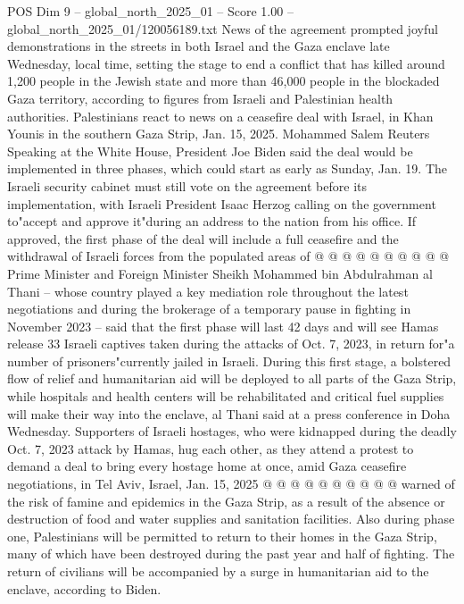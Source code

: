 \begin{textsample}{POS Dim 9 – global\_north\_2025\_01 – Score 1.00 – global\_north\_2025\_01/120056189.txt}  \label{ex:f9_pos_355}
News of the agreement prompted joyful demonstrations in the streets in both Israel and the Gaza enclave late Wednesday, local time, setting the stage to end a conflict that has killed around 1,200 people in the Jewish state and more than 46,000 people in the blockaded Gaza territory, according to figures from Israeli and Palestinian health authorities.
Palestinians react to news on a ceasefire deal with Israel, in Khan Younis in the southern Gaza Strip, Jan. 15, 2025.
Mohammed Salem Reuters Speaking at the White House, President Joe Biden said the deal would be implemented in three phases, which could start as early as Sunday, Jan. 19.
The Israeli security cabinet must still vote on the agreement before its implementation, with Israeli President Isaac Herzog calling on the government to"accept and approve it"during an address to the nation from his office.
If approved, the first phase of the deal will include a full ceasefire and the withdrawal of Israeli forces from the populated areas of @ @ @ @ @ @ @ @ @ @ Prime Minister and Foreign Minister Sheikh Mohammed bin Abdulrahman al Thani -- whose country played a key mediation role throughout the latest negotiations and during the brokerage of a temporary pause in fighting in November 2023 -- said that the first phase will last 42 days and will see Hamas release 33 Israeli captives taken during the attacks of Oct. 7, 2023, in return for"a number of prisoners"currently jailed in Israeli.
During this first stage, a bolstered flow of relief and humanitarian aid will be deployed to all parts of the Gaza Strip, while hospitals and health centers will be rehabilitated and critical fuel supplies will make their way into the enclave, al Thani said at a press conference in Doha Wednesday.
Supporters of Israeli hostages, who were kidnapped during the deadly Oct. 7, 2023 attack by Hamas, hug each other, as they attend a protest to demand a deal to bring every hostage home at once, amid Gaza ceasefire negotiations, in Tel Aviv, Israel, Jan. 15, 2025 @ @ @ @ @ @ @ @ @ @ warned of the risk of famine and epidemics in the Gaza Strip, as a result of the absence or destruction of food and water supplies and sanitation facilities.
Also during phase one, Palestinians will be permitted to return to their homes in the Gaza Strip, many of which have been destroyed during the past year and half of fighting.
The return of civilians will be accompanied by a surge in humanitarian aid to the enclave, according to Biden.

\end{textsample}

